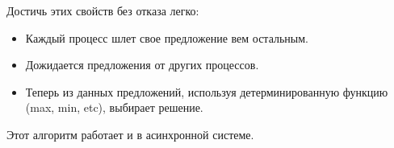 \begin{remark}
Достичь этих свойств без отказа легко:
    \begin{itemize}
        \item Каждый процесс шлет свое предложение вем остальным.
        \item Дожидается предложения от других процессов.
        \item Теперь из данных предложений, используя детерминированную функцию 
            (max, min, etc), выбирает решение.
    \end{itemize}
\end{remark}

\begin{remark}
    Этот алгоритм работает и в асинхронной системе.
\end{remark}

